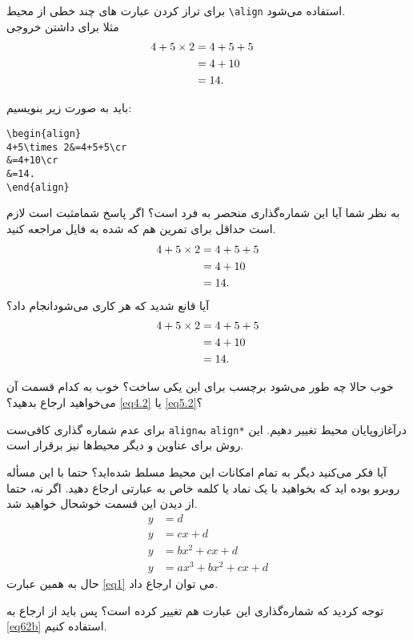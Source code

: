 \begin{theorem}
برای تراز کردن عبارت  های چند خطی از محیط \verb|\align| استفاده می‌شود.\\
مثلا برای داشتن خروجی
\begin{align}
4+5\times 2&=4+5+5\cr
&=4+10\cr
&=14.
\end{align}

باید به صورت زیر بنویسیم:
\begin{LTR}
\begin{verbatim}
\begin{align}
4+5\times 2&=4+5+5\cr
&=4+10\cr
&=14.
\end{align}
\end{verbatim}
\end{LTR}

\begin{description}
\iq
به نظر شما آیا این شماره‌گذاری منحصر به فرد است؟
\ia
اگر پاسخ‌ شمامثبت است لازم است حداقل برای تمرین هم که شده به فایل مراجعه کنید.
\begin{align}
4+5\times 2&=4+5+5\cr
&=4+10\\
&=14.\nonumber
\end{align}
آیا قانع شدید که هر کاری می‌شودانجام داد؟
\begin{align}
4+5\times 2&=4+5+5\label{eq4.2}\\
&=4+10\cr
&=14.\label{eq5.2}
\end{align}
\end{description}
\begin{description}
\iq
خوب حالا چه طور می‌شود برچسب برای این یکی ساخت؟
\ia
خوب به کدام قسمت آن می‌خواهید ارجاع بدهید؟ \eqref{eq4.2} یا \eqref{eq5.2}؟ 
\end{description}

برای عدم شماره گذاری کافی‌ست \verb|align|به \verb|align*| درآغازوپایان محیط تغییر دهیم. این روش برای عناوین و دیگر محیط‌ها نیز برقرار است.
\begin{description}
\iq
آیا فکر می‌کنید دیگر به تمام امکانات این محیط مسلط شده‌اید؟ حتما با این مسأله روبرو بوده اید که بخواهید با یک نماد یا کلمه خاص به عبارتی ارجاع دهید.
\ia
اگر نه، حتما از دیدن این قسمت خوشحال خواهید شد.
\begin{subequations}
\begin{align}
y & = d\tag{هر چه می‌خواهد دل تنگت بنام}\label{eq1}\\
y & = cx+d\\
y & = bx^{2}+cx+d\label{eq62b}\\
y & = ax^{3}+bx^{2}+cx+d
\end{align}
\end{subequations}
حال به همین عبارت \eqref{eq1} می‌ توان  ارجاع داد.
\begin{point}
توجه کردید که شماره‌گذاری این عبارت هم تغییر کرده است؟ پس باید از ارجاع به \eqref{eq62b} استفاده کنیم.
\end{point}


\end{description}
\end{theorem}
